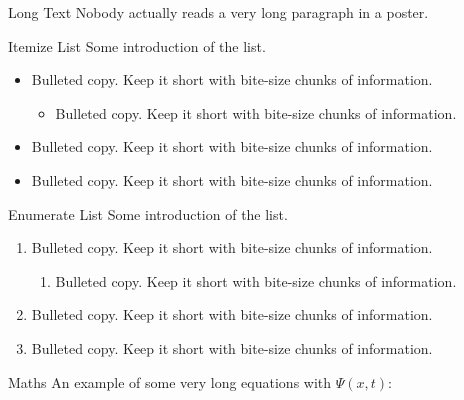 \documentclass{purdue-poster}
\title{\VERYHuge{A Purdue \LaTeX\ Poster Template}}
\author{\Large{A Purdue Student\texorpdfstring{\textsuperscript{1}}{}, A Duepur Student\texorpdfstring{\textsuperscript{2}}{}}}
\institute
{Purdue University\texorpdfstring{\textsuperscript{1}}{}, Duepur University\texorpdfstring{\textsuperscript{2}},\\
Appearing at Overleaf Template}
\date{\today}
\begin{document}
\begin{frame}{}
    \begin{columns}[c]
    \begin{column}{.45\linewidth}
    \begin{block}{\large Long Text}
        Nobody actually reads a very long paragraph in a poster.

        \bigskip

        \lipsum[2]

        \lipsum[2]
    \end{block}

    \begin{block}{Itemize List}
        Some introduction of the list.
        \begin{itemize}
            \item Bulleted copy. Keep it short with bite-size chunks of information.
            \begin{itemize}
                \item Bulleted copy. Keep it short with bite-size chunks of information.
            \end{itemize}
            \item Bulleted copy. Keep it short with bite-size chunks of information.
            \item Bulleted copy. Keep it short with bite-size chunks of information.
        \end{itemize}
    \end{block}

    \begin{block}{Enumerate List}
        Some introduction of the list.
        \begin{enumerate}
            \item Bulleted copy. Keep it short with bite-size chunks of information.
            \begin{enumerate}
                \item Bulleted copy. Keep it short with bite-size chunks of information.
            \end{enumerate}
            \item Bulleted copy. Keep it short with bite-size chunks of information.
            \item Bulleted copy. Keep it short with bite-size chunks of information.
        \end{enumerate}
    \end{block}

    \begin{block}{Maths}
        An example of some very long equations with $\Psi (x,t)$:
        

\end{block}
\end{column}
\end{columns}
\end{frame}
\end{document}
